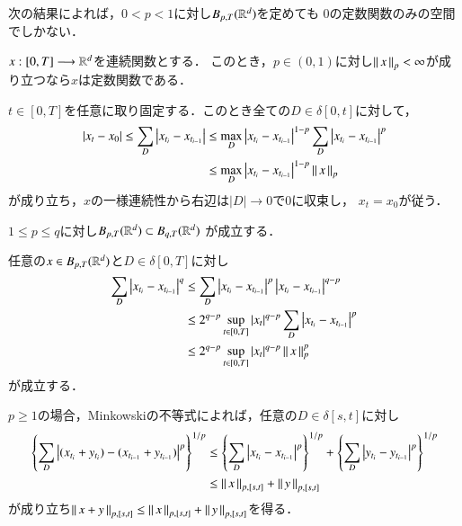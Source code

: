 次の結果によれば，$0 < p < 1$に対し$B_{p,T}(\mathbb{R}^d)$を定めても
$0$の定数関数のみの空間でしかない．
\begin{screen}
	\begin{thm}
		$x:[0,T] \longrightarrow \mathbb{R}^d$を連続関数とする．
		このとき，$p \in (0, 1)$に対し$\left\|\, x\, \right\|_{p} < \infty$が成り立つなら$x$は定数関数である．
	\end{thm}
\end{screen}

\begin{prf}
	$t \in [0,T]$を任意に取り固定する．このとき全ての$D \in \delta[0,t]$に対して，
	\begin{align}
		|x_t - x_0| \leq \sum_D \left| x_{t_i} - x_{t_{i-1}} \right|
		&\leq \operatorname*{max}_{D} \left| x_{t_i} - x_{t_{i-1}} \right|^{1-p} 
			\sum_D \left| x_{t_i} - x_{t_{i-1}} \right|^p \\
		&\leq \operatorname*{max}_{D} \left| x_{t_i} - x_{t_{i-1}} \right|^{1-p} \left\|\, x\, \right\|_{p}
	\end{align}
	が成り立ち，$x$の一様連続性から右辺は$|D| \longrightarrow 0$で$0$に収束し，
	$x_t = x_0$が従う．
	\QED
\end{prf}

\begin{screen}
	\begin{thm}
		$1 \leq p \leq q$に対し$B_{p,T}(\mathbb{R}^d) \subset B_{q,T}(\mathbb{R}^d)$
		が成立する．
	\end{thm}
\end{screen}

\begin{prf}
	任意の$x \in B_{p,T}(\mathbb{R}^d)$と$D \in \delta[0,T]$に対し
	\begin{align}
		\sum_D \left| x_{t_i} - x_{t_{i-1}} \right|^q
		&\leq \sum_D \left| x_{t_i} - x_{t_{i-1}} \right|^p \left| x_{t_i} - x_{t_{i-1}} \right|^{q-p} \\
		&\leq 2^{q-p}\operatorname*{sup}_{t \in [0,T]} \left| x_t \right|^{q-p} \sum_D \left| x_{t_i} - x_{t_{i-1}} \right|^p \\
		&\leq 2^{q-p}\operatorname*{sup}_{t \in [0,T]} \left| x_t \right|^{q-p} \left\|\, x\, \right\|_{p}^p
	\end{align}
	が成立する．
	\QED
\end{prf}

$p \geq 1$の場合，Minkowskiの不等式によれば，任意の$D \in \delta[s,t]$に対し
\begin{align}
	\left\{ \sum_D \left| (x_{t_i} + y_{t_i}) - (x_{t_{i-1}} + y_{t_{i-1}}) \right|^p \right\}^{1/p}
	&\leq \left\{ \sum_D \left| x_{t_i} - x_{t_{i-1}} \right|^p \right\}^{1/p}
		+ \left\{ \sum_D \left| y_{t_i} - y_{t_{i-1}} \right|^p \right\}^{1/p} \\
	&\leq \left\|\, x\, \right\|_{p,[s,t]} + \left\|\, y\, \right\|_{p,[s,t]}
\end{align}
が成り立ち$\left\|\, x + y\, \right\|_{p,[s,t]} \leq \left\|\, x\, \right\|_{p,[s,t]} + \left\|\, y\, \right\|_{p,[s,t]}$を得る．

